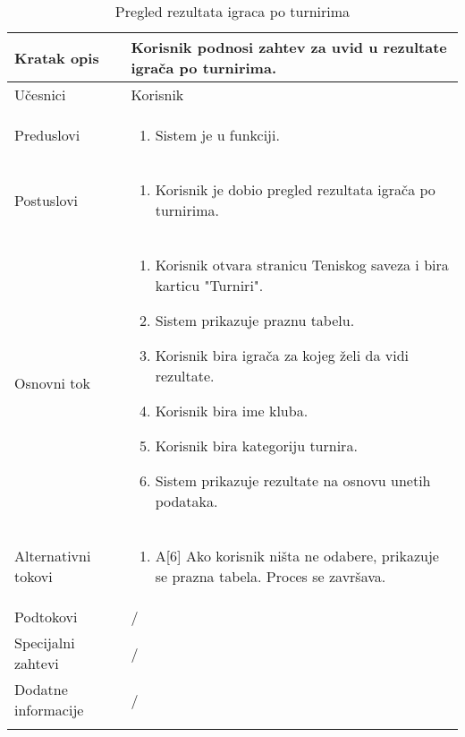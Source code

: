\documentclass{article}
\begin{document}
    \begin{longtable}{| p{} | p{} |} 
        \hline
            Kratak opis & Korisnik podnosi zahtev za uvid u rezultate igrača po turnirima.\\ 
        \hline    
            Učesnici & Korisnik\\
        \hline
            Preduslovi & 
                \begin{enumerate}
                    \item Sistem je u funkciji.
                \end{enumerate}\\
        \hline  
            Postuslovi & 
                \begin{enumerate}
                    \item Korisnik je dobio pregled rezultata igrača po turnirima.
                \end{enumerate}\\
        \hline
            Osnovni tok & 
                \begin{enumerate}
                    \item Korisnik otvara stranicu Teniskog saveza i bira karticu "Turniri".
                    \item Sistem prikazuje praznu tabelu.
                    \item Korisnik bira igrača za kojeg želi da vidi rezultate.
                    \item Korisnik bira ime kluba.
                    \item Korisnik bira kategoriju turnira.
                    \item Sistem prikazuje rezultate na osnovu unetih podataka.
                \end{enumerate}\\
        \hline
            Alternativni tokovi & 
                \begin{enumerate}
                    \item A[6] Ako korisnik ništa ne odabere, prikazuje se prazna tabela. Proces se završava.
                \end{enumerate}\\
        \hline
            Podtokovi & /\\
        \hline
            Specijalni zahtevi & /\\
        \hline
            Dodatne informacije & /\\
        \hline
        \caption{Pregled rezultata igraca po turnirima}
    \end{longtable}
\end{document}
